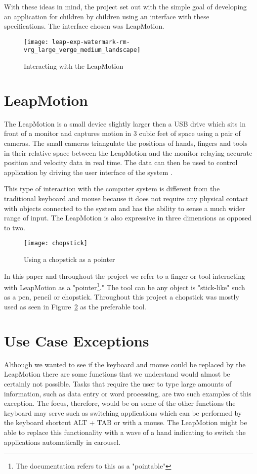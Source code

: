 With these ideas in mind, the project set out with the simple goal of developing an application for children by children using an interface with these specifications. The interface chosen was LeapMotion.


\begin{figure}
\centering

\texttt{[image: leap-exp-watermark-rm-vrg\_large\_verge\_medium\_landscape]}
\caption{Interacting with the LeapMotion \cite{theverge} }
\label{fig:leapmotionpicture}
\end{figure}

\section{LeapMotion}

The LeapMotion is a small device slightly larger then a USB drive which sits in front of a monitor and captures motion in 3 cubic feet of space using a pair of cameras. The small cameras triangulate the positions of hands, fingers and tools in their relative space between the LeapMotion and the monitor relaying accurate position and velocity data in real time. The data can then be used to control application by driving the user interface of the system \cite{leapmotion}. 

This type of interaction with the computer system is different from the traditional keyboard and mouse because it does not require any physical contact with objects connected to the system and has the ability to sense a much wider range of input. The LeapMotion is also expressive in three dimensions as opposed to two.

\begin{figure}
\centering

\texttt{[image: chopstick]}
\caption{Using a chopstick as a pointer}
\label{fig:chopstick}
\end{figure}
In this paper and throughout the project we refer to a finger or tool interacting with LeapMotion as a "pointer\footnote{The documentation refers to this as a "pointable"}." The tool can be any object is "stick-like" such as a pen, pencil or chopstick. Throughout this project a chopstick was mostly used as seen in Figure~\ref{fig:chopstick} as the preferable tool.

\section{Use Case Exceptions}
Although we wanted to see if the keyboard and mouse could be replaced by the LeapMotion there are some functions that we understand would almost be certainly not possible. Tasks that require the user to type large amounts of information, such as data entry or word processing, are two such examples of this exception. The focus, therefore, would be on some of the other functions the keyboard may serve such as switching applications which can be performed by the keyboard shortcut ALT + TAB or with a mouse. The LeapMotion might be able to replace this functionality with a wave of a hand indicating to switch the applications automatically in carousel. 

